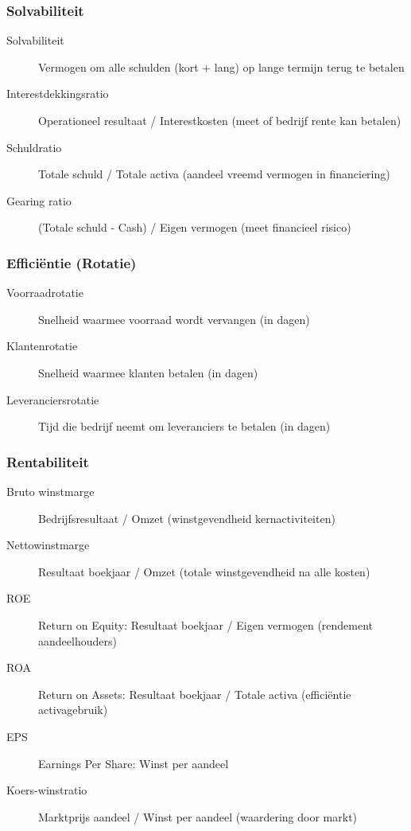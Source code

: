 \documentclass[a4paper,11pt]{article}
\begin{document}
\subsubsection{Solvabiliteit}
\begin{description}
    \item[Solvabiliteit] Vermogen om alle schulden (kort + lang) op lange termijn terug te betalen
    \item[Interestdekkingsratio] Operationeel resultaat / Interestkosten (meet of bedrijf rente kan betalen)
    \item[Schuldratio] Totale schuld / Totale activa (aandeel vreemd vermogen in financiering)
    \item[Gearing ratio] (Totale schuld - Cash) / Eigen vermogen (meet financieel risico)
\end{description}

\subsubsection{Efficiëntie (Rotatie)}
\begin{description}
    \item[Voorraadrotatie] Snelheid waarmee voorraad wordt vervangen (in dagen)
    \item[Klantenrotatie] Snelheid waarmee klanten betalen (in dagen)
    \item[Leveranciersrotatie] Tijd die bedrijf neemt om leveranciers te betalen (in dagen)
\end{description}

\subsubsection{Rentabiliteit}
\begin{description}
    \item[Bruto winstmarge] Bedrijfsresultaat / Omzet (winstgevendheid kernactiviteiten)
    \item[Nettowinstmarge] Resultaat boekjaar / Omzet (totale winstgevendheid na alle kosten)
    \item[ROE] Return on Equity: Resultaat boekjaar / Eigen vermogen (rendement aandeelhouders)
    \item[ROA] Return on Assets: Resultaat boekjaar / Totale activa (efficiëntie activagebruik)
    \item[EPS] Earnings Per Share: Winst per aandeel
    \item[Koers-winstratio] Marktprijs aandeel / Winst per aandeel (waardering door markt)
\end{description}
\end{document}
